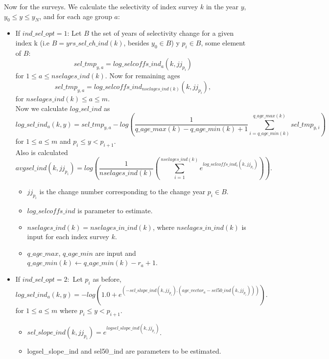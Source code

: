 \documentclass{article}
\begin{document}
Now for the surveys. We calculate the selectivity of index survey $k$ in the year $y$, $y_0\leq y \leq y_N$, and for each age group $a$:\\
\begin{itemize}

\item If $ind\_sel\_opt=1$:
Let $B$ the set of years of selectivity change for a given index k (i.e $B= yrs\_sel\_ch\_ind(k)$, besides $y_0\in B$) y $p_i\in B$, some element of $B$:
\begin{equation}
    sel\_tmp_{y,a} = log\_selcoffs\_ind_a(k,jj_{p_i})
\end{equation}
for $1\leq a \leq nselages\_ind(k)$.
Now for remaining ages
\begin{equation}
    sel\_tmp_{y,a}= log\_selcoffs\_ind_{nselages\_ind(k)}(k,jj_{p_i}),
\end{equation}
for $nselages\_ind(k)\leq a \leq m$. \\

Now we calculate $log\_sel\_ind$ as
     \begin{equation}
        log\_sel\_ind_a(k,y)=sel\_tmp_{y,a}-log\left(\dfrac{1}{q\_age\_max(k)-q\_age\_min(k)+1}\sum_{i=q\_age\_min(k)}^{q\_age\_max(k)}sel\_tmp_{y,i}\right)
    \end{equation}
    for $1\leq a \leq m$ and $p_i\leq y < p_{i+1}$.\\
    Also is calculated
    \begin{equation}
        avgsel\_ind(k,jj_{p_i})=log\left(\dfrac{1}{nselages\_ind(k)}\left( \sum_{i=1}^{nselages\_ind(k)}e^{log\_selcoffs\_ind_i(k,jj_{p_i})}\right)\right).
    \end{equation}
    
\begin{itemize}    
    \item $jj_{p_i}$ is the change number corresponding to the change year  $p_i\in B$.
    \item $log\_selcoffs\_ind$ is parameter to estimate.
     \item $nselages\_ind(k)=nselages\_in\_ind(k)$, where $nselages\_in\_ind(k)$ is input for each index survey $k$.
     \item $q\_age\_max$, $q\_age\_min$ are input and $q\_age\_min(k) \leftarrow  q\_age\_min(k) - r_a + 1$.
\end{itemize}

    
    \item If $ind\_sel\_opt=2:$
    Let $p_i$ as before, 
\begin{equation}
            log\_sel\_ind_a(k,y) = - log( 1.0 + e^{(-sel\_slope\_ind(k,jj_{p_i}) . ( age\_vector_a - sel50\_ind(k,jj_{p_i})) )}).
        \end{equation}
        for $1\leq a \leq m
$ where $p_i\leq y < p_{i+1}$.
        \begin{itemize}
            \item $sel\_slope\_ind(k,jj_{p_i}) = e^{logsel\_slope\_ind(k,jj_{p_i})}$.
            \item logsel\_slope\_ind and sel50\_ind are parameters to be estimated.
        \end{itemize}


\end{itemize}
\end{document}
